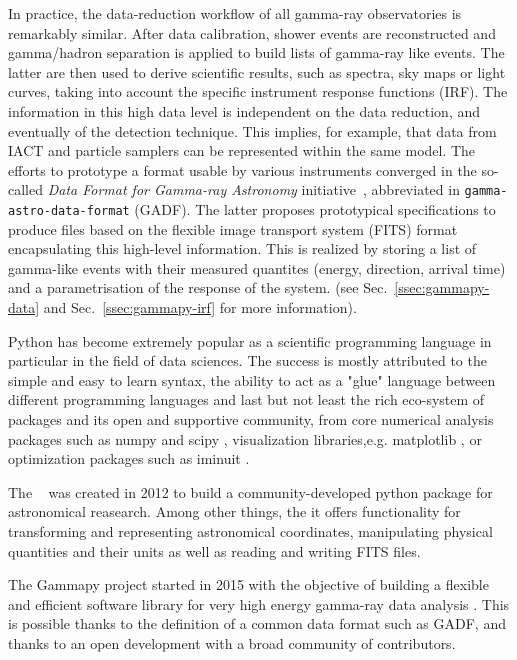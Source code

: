 In practice, the data-reduction workflow of all gamma-ray observatories
is remarkably similar.
After data calibration, shower events are reconstructed and
gamma/hadron separation is applied to build lists of gamma-ray like events.
The latter are then used to derive scientific results, such as spectra, sky maps
or light curves, taking into account the specific instrument response functions (IRF).
The information in this high data level is independent on
the data reduction, and eventually of the detection technique. This implies,
for example, that data from IACT and particle samplers can be represented
within the same model. The efforts to prototype a format usable by various instruments
converged in the so-called \textit{Data Format for Gamma-ray Astronomy}
initiative~\citep{gadf_proc, gadf_universe}, abbreviated in
\texttt{gamma-astro-data-format} (GADF). The latter proposes prototypical
specifications to produce files based on the flexible image transport system
(FITS) format~\citep{fits} encapsulating this high-level information. This is
realized by storing a list of gamma-like events with their measured quantites
(energy, direction, arrival time) and a parametrisation of the response of the
system. (see Sec.~\ref{ssec:gammapy-data} and Sec.~\ref{ssec:gammapy-irf} for
more information).

Python has become extremely popular as a scientific programming language
in particular in the field of data sciences. The success is
mostly attributed to the simple and easy to learn syntax, the ability to act as
a "glue" language between different programming languages and last but not least
the rich eco-system of packages and its open and supportive community, from
core numerical analysis packages such as numpy \citep{numpy} and
scipy \citep{2020SciPy-NMeth}, visualization libraries,e.g. matplotlib \citep{matplotlib},
or optimization packages such as iminuit \citep{iminuit}.

The \astropy~\citep{astropy} was created in 2012 to build a community-developed
python package for astronomical reasearch. Among other things, the it offers functionality for
transforming and representing astronomical coordinates, manipulating physical quantities
and their units as well as reading and writing FITS files.

The Gammapy project started in 2015 with the objective of building a flexible and
efficient software library for very high energy gamma-ray data analysis \citep{gammapy_2015}.
This is possible thanks to the definition of a common data format such as GADF, and thanks to
an open development with a broad community of contributors.


